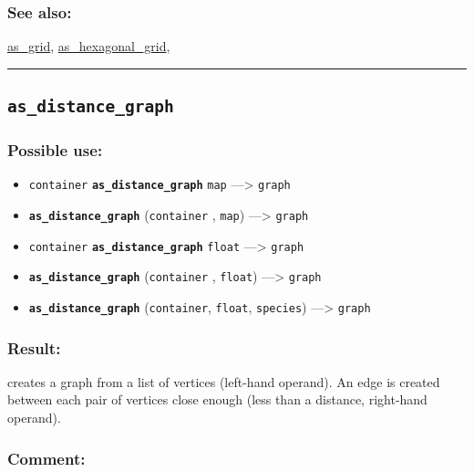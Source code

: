 \documentclass[]{book}
\providecommand{\tightlist}{%
  \setlength{\itemsep}{0pt}\setlength{\parskip}{0pt}}
\theoremstyle{definition}
\theoremstyle{definition}
\theoremstyle{definition}
\theoremstyle{remark}
\begin{document}
\subsubsection{See also:}\label{see-also-29}

\href{OperatorsAA\#as_grid}{as\_grid},
\href{OperatorsAA\#as_hexagonal_grid}{as\_hexagonal\_grid},

\begin{center}\rule{0.5\linewidth}{\linethickness}\end{center}

\subsection{\texorpdfstring{\texttt{as\_distance\_graph}}{as\_distance\_graph}}\label{as_distance_graph}

\subsubsection{Possible use:}\label{possible-use-45}

\begin{itemize}
\tightlist
\item
  \texttt{container} \textbf{\texttt{as\_distance\_graph}} \texttt{map}
  ---\textgreater{} \texttt{graph}
\item
  \textbf{\texttt{as\_distance\_graph}} (\texttt{container} ,
  \texttt{map}) ---\textgreater{} \texttt{graph}
\item
  \texttt{container} \textbf{\texttt{as\_distance\_graph}}
  \texttt{float} ---\textgreater{} \texttt{graph}
\item
  \textbf{\texttt{as\_distance\_graph}} (\texttt{container} ,
  \texttt{float}) ---\textgreater{} \texttt{graph}
\item
  \textbf{\texttt{as\_distance\_graph}} (\texttt{container},
  \texttt{float}, \texttt{species}) ---\textgreater{} \texttt{graph}
\end{itemize}

\subsubsection{Result:}\label{result-44}

creates a graph from a list of vertices (left-hand operand). An edge is
created between each pair of vertices close enough (less than a
distance, right-hand operand).

\subsubsection{Comment:}\label{comment-9}
\end{document}

